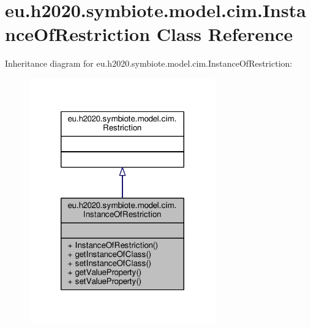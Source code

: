 \hypertarget{classeu_1_1h2020_1_1symbiote_1_1model_1_1cim_1_1InstanceOfRestriction}{}\section{eu.\+h2020.\+symbiote.\+model.\+cim.\+Instance\+Of\+Restriction Class Reference}
\label{classeu_1_1h2020_1_1symbiote_1_1model_1_1cim_1_1InstanceOfRestriction}


Inheritance diagram for eu.\+h2020.\+symbiote.\+model.\+cim.\+Instance\+Of\+Restriction\+:
\nopagebreak
\begin{figure}[H]
\begin{center}
\leavevmode
\includegraphics[width=228pt]{classeu_1_1h2020_1_1symbiote_1_1model_1_1cim_1_1InstanceOfRestriction__inherit__graph}
\end{center}
\end{figure}


